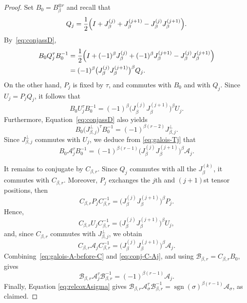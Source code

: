 \documentclass[reqno]{amsart}
\DeclareMathOperator{\sgn}{sgn}
\theoremstyle{definition}
\begin{document}
\begin{proof}
Set
$ B_0=B_\beta^{\otimes r}$ and recall that
\[
Q_j
=
\frac12\Bigl(
I+J_\beta^{(j)}+J_\beta^{(j+1)}
-J_\beta^{(j)}J_\beta^{(j+1)}
\Bigr).
\]
By~\eqref{eq:conjassD},
\[
\begin{aligned}
B_0Q_j^\tau B_0^{-1}
&=
\frac12\Bigl(
I+(-1)^\beta J_\beta^{(j)}
+(-1)^\beta J_\beta^{(j+1)}
-J_\beta^{(j)}J_\beta^{(j+1)}
\Bigr)\\
&=
(-1)^\beta
\bigl(J_\beta^{(j)}J_\beta^{(j+1)}\bigr)^\beta
Q_j.
\end{aligned}
\]
On the other hand, $P_j$ is fixed by $\tau$, and commutes with $B_0$ and
with $Q_j$.
Since $U_j=P_jQ_j$, it follows that
\begin{equation}
\label{eq:galois-Tj}
B_0U_j^\tau B_0^{-1}
=
(-1)^\beta
\bigl(J_\beta^{(j)}J_\beta^{(j+1)}\bigr)^\beta
U_j.
\end{equation}
Furthermore, Equation~\eqref{eq:conjassD} also yields
\[
B_0\bigl(J_{\beta,j}^{\perp}\bigr)^\tau B_0^{-1}
=
(-1)^{\beta(r-2)}J_{\beta,j}^{\perp}.
\]
Since $J_{\beta,j}^{\perp}$ commutes with $U_j$, we deduce from
\eqref{eq:galois-Tj} that
\begin{equation}
\label{eq:galois-A-before-C}
B_0\mathcal A_j^\tau B_0^{-1}
=
(-1)^{\beta(r-1)}
\bigl(J_\beta^{(j)}J_\beta^{(j+1)}\bigr)^\beta
\mathcal A_j.
\end{equation}

It remains to conjugate by $C_{\beta,r}$. Since $Q_j$ commutes with all
the $J_\beta^{(k)}$, it commutes with $C_{\beta,r}$. Moreover, $P_j$
exchanges the $j$th and $(j+1)$st tensor positions, then
\[
C_{\beta,r}P_jC_{\beta,r}^{-1}
=
\bigl(J_\beta^{(j)}J_\beta^{(j+1)}\bigr)^\beta P_j.
\]
Hence,
\[
C_{\beta,r}U_jC_{\beta,r}^{-1}
=
\bigl(J_\beta^{(j)}J_\beta^{(j+1)}\bigr)^\beta U_j,
\]
and, since $C_{\beta,r}$ commutes with $J_{\beta,j}^{\perp}$, we obtain
\begin{equation}
\label{eq:conj-C-Aj}
C_{\beta,r}\mathcal A_jC_{\beta,r}^{-1}
=
\bigl(J_\beta^{(j)}J_\beta^{(j+1)}\bigr)^\beta
\mathcal A_j.
\end{equation}
Combining~\eqref{eq:galois-A-before-C} and
\eqref{eq:conj-C-Aj}, and using
$\mathcal B_{\beta,r}=C_{\beta,r}B_0$, gives
\[
\mathcal B_{\beta,r}\mathcal A_j^\tau
\mathcal B_{\beta,r}^{-1}
=
(-1)^{\beta(r-1)}\mathcal A_j.
\]
Finally, Equation \eqref{eq:relcoxAsigma} gives
$
\mathcal B_{\beta,r}\mathcal A_\sigma^\tau
\mathcal B_{\beta,r}^{-1}
=
\sgn(\sigma)^{\beta(r-1)}\mathcal A_\sigma
$,
as claimed.
\end{proof}
\end{document}
